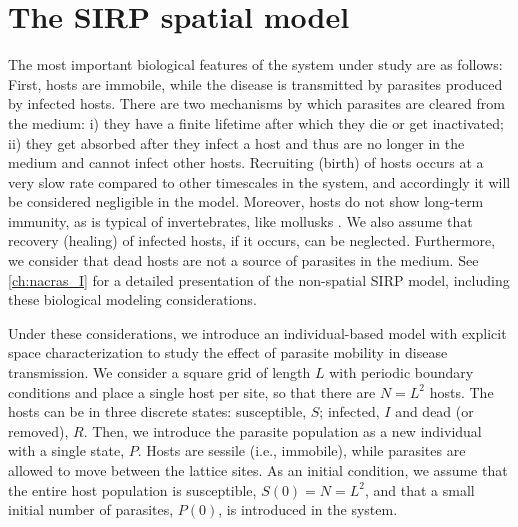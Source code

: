 
\section{The SIRP spatial model} \label{sec:model}

The most important biological features of the system under study are as
follows: First, hosts are immobile, while the disease is transmitted by
parasites produced by infected hosts. There are two mechanisms by which
parasites are cleared from the medium: i) they have a finite lifetime after
which they die or get inactivated; ii) they get absorbed after they infect a
host and thus are no longer in the medium and cannot infect other hosts.
Recruiting (birth) of hosts occurs at a very slow rate compared to other
timescales in the system, and accordingly it will be considered negligible in
the model. Moreover, hosts do not show long-term immunity, as is typical of
invertebrates, like mollusks \cite{Powell2015}. We also assume that recovery
(healing) of infected hosts, if it occurs, can be neglected. Furthermore, we
consider that dead hosts are not a source of parasites in the medium. See
\cref{ch:nacras_I} \cite{GimenezRomero2021} for a detailed presentation of the
non-spatial SIRP model, including these biological modeling considerations.

Under these considerations, we introduce an individual-based model with
explicit space characterization to study the effect of parasite mobility in
disease transmission. We consider a square grid of length $L$ with periodic
boundary conditions and place a single host per site, so that there are $N=L^2$
hosts. The hosts can be in three discrete states: susceptible, $S$; infected,
$I$ and dead (or removed), $R$. Then, we introduce the parasite population as a
new individual with a single state, $P$. Hosts are sessile (i.e., immobile),
while parasites are allowed to move between the lattice sites. As an initial
condition, we assume that the entire host population is susceptible,
$S(0)=N=L^2$, and that a small initial number of parasites, $P(0)$, is
introduced in the system.

